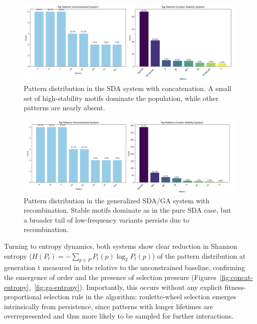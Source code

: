 \documentclass[life,article,submit,pdftex,moreauthors]{Definitions/mdpi}
\begin{document}
\begin{figure}[H]
    \centering
    \includegraphics[width=1\textwidth]{SDA-concat-patterns.png}
    \caption{Pattern distribution in the SDA system with concatenation. A small set of high-stability motifs dominate the population, while other patterns are nearly absent.}
    \label{fig:concat-patterns}
\end{figure}

\begin{figure}[H]
    \centering
    \includegraphics[width=1\textwidth]{SDA-GA-patterns.png}
    \caption{Pattern distribution in the generalized SDA/GA system with recombination. Stable motifs dominate as in the pure SDA case, but a broader tail of low-frequency variants persists due to recombination.}
    \label{fig:ga-patterns}
\end{figure}

Turning to entropy dynamics, both systems show clear reduction in Shannon entropy ($H(P_t) = - \sum_{p \in P} P_t(p) \log_2 P_t(p)$) of
the pattern distribution at generation t measured in bits relative to the unconstrained baseline, confirming the emergence of order and the presence of selection pressure (Figures~\ref{fig:concat-entropy},~\ref{fig:ga-entropy}). Importantly, this occurs without any explicit fitness-proportional selection rule in the algorithm: roulette-wheel selection emerges intrinsically from persistence, since patterns with longer lifetimes are overrepresented and thus more likely to be sampled for further interactions.
\end{document}
